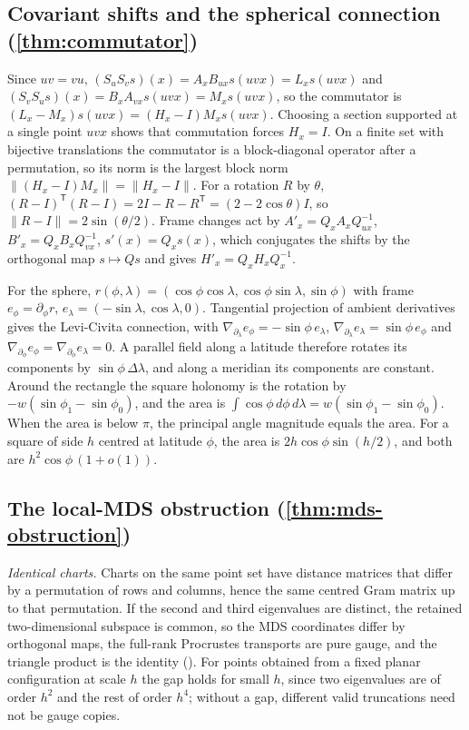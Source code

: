 \subsection{Covariant shifts and the spherical connection (\texorpdfstring{\cref{thm:commutator}}{Theorem 7.1})}
\label{app:connection-proof}

Since $uv=vu$, $(S_uS_vs)(x)=A_xB_{ux}s(uvx)=L_xs(uvx)$ and $(S_vS_us)(x)=B_xA_{vx}s(uvx)=M_xs(uvx)$, so the commutator is $(L_x-M_x)s(uvx)=(H_x-I)M_xs(uvx)$.
Choosing a section supported at a single point $uvx$ shows that commutation forces $H_x=I$.
On a finite set with bijective translations the commutator is a block-diagonal operator after a permutation, so its norm is the largest block norm $\|(H_x-I)M_x\|=\|H_x-I\|$.
For a rotation $R$ by $\theta$, $(R-I)^{\mathsf T}(R-I)=2I-R-R^{\mathsf T}=(2-2\cos\theta)I$, so $\|R-I\|=2\sin(\theta/2)$.
Frame changes act by $A'_x=Q_xA_xQ_{ux}^{-1}$, $B'_x=Q_xB_xQ_{vx}^{-1}$, $s'(x)=Q_xs(x)$, which conjugates the shifts by the orthogonal map $s\mapsto Q s$ and gives $H'_x=Q_xH_xQ_x^{-1}$.

For the sphere, $r(\phi,\lambda)=(\cos\phi\cos\lambda,\cos\phi\sin\lambda,\sin\phi)$ with frame $e_\phi=\partial_\phi r$, $e_\lambda=(-\sin\lambda,\cos\lambda,0)$.
Tangential projection of ambient derivatives gives the Levi-Civita connection, with $\nabla_{\partial_\lambda}e_\phi=-\sin\phi\,e_\lambda$, $\nabla_{\partial_\lambda}e_\lambda=\sin\phi\,e_\phi$ and $\nabla_{\partial_\phi}e_\phi=\nabla_{\partial_\phi}e_\lambda=0$.
A parallel field along a latitude therefore rotates its components by $\sin\phi\,\Delta\lambda$, and along a meridian its components are constant.
Around the rectangle the square holonomy is the rotation by $-w(\sin\phi_1-\sin\phi_0)$, and the area is $\int\cos\phi\,d\phi\,d\lambda=w(\sin\phi_1-\sin\phi_0)$.
When the area is below $\pi$, the principal angle magnitude equals the area. For a square of side $h$ centred at latitude $\phi$, the area is $2h\cos\phi\sin(h/2)$, and both are $h^2\cos\phi\,(1+o(1))$.

\subsection{The local-MDS obstruction (\texorpdfstring{\cref{thm:mds-obstruction}}{Theorem 7.2})}
\label{app:mds-proof}

\emph{Identical charts.}
Charts on the same point set have distance matrices that differ by a permutation of rows and columns, hence the same centred Gram matrix up to that permutation.
If the second and third eigenvalues are distinct, the retained two-dimensional subspace is common, so the MDS coordinates differ by orthogonal maps, the full-rank Procrustes transports are pure gauge, and the triangle product is the identity (). For points obtained from a fixed planar configuration at scale $h$ the gap holds for small $h$, since two eigenvalues are of order $h^2$ and the rest of order $h^4$; without a gap, different valid truncations need not be gauge copies.

